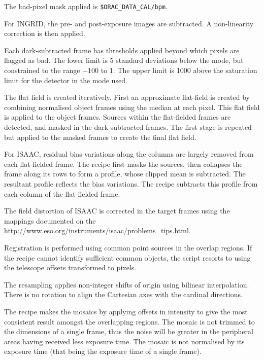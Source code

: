 \documentclass[twoside,11pt,nolof]{starlink}
\begin{document}
{{{         \sstitem
         The bad-pixel mask applied is {\tt\$ORAC\_DATA\_CAL/bpm}.

         \sstitem
         For INGRID, the pre- and post-exposure images are subtracted.
         A non-linearity correction is then applied.

         \sstitem
         Each dark-subtracted frame has thresholds applied beyond which
         pixels are flagged as bad.  The lower limit is 5 standard
         deviations below the mode, but constrained to the range $-$100 to 1.
         The upper limit is 1000 above the saturation limit for the detector
         in the mode used.

         \sstitem
         The flat field is created iteratively.  First an approximate
         flat-field is created by combining normalised object frames using
         the median at each pixel.  This flat field is applied to the object
         frames.  Sources within the flat-fielded frames are detected, and
         masked in the dark-subtracted frames.  The first stage is repeated
         but applied to the masked frames to create the final flat field.

         \sstitem
         For ISAAC, residual bias variations along the columns are
         largely removed from each flat-fielded frame.  The recipe first
         masks the sources, then collapses the frame along its rows to form
         a profile, whose clipped mean is subtracted.  The resultant profile
         reflects the bias variations.  The recipe subtracts this profile
         from each column of the flat-fielded frame.

         \sstitem
         The field distortion of ISAAC is corrected in the target frames
         using the mappings documented on the
         {http://www.eso.org/instruments/isaac/problems_tips.html}.

         \sstitem
         Registration is performed using common point sources in the
         overlap regions.  If the recipe cannot identify sufficient common
         objects, the script resorts to using the telescope offsets
         transformed to pixels.

         \sstitem
         The resampling applies non-integer shifts of origin using
         bilinear interpolation.  There is no rotation to align the
         Cartesian axes with the cardinal directions.

         \sstitem
         The recipe makes the mosaics by applying offsets in intensity
         to give the most consistent result amongst the overlapping regions.
         The mosaic is not trimmed to the dimensions of a single frame, thus
         the noise will be greater in the peripheral areas having received
         less exposure time.  The mosaic is not normalised by its exposure
         time (that being the exposure time of a single frame).

}}}
\end{document}
